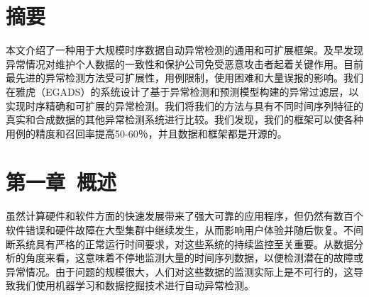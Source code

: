 \documentclass[a4paper,AutoFakeBold,oneside,12pt]{book}
\begin{document}
\thispagestyle{empty}

\begin{center}
\sihao{}

\xiaosihao{}

\xiaosihao{}
\end{center}

\songti{}
\let\clearpage\relax


\chapter*{摘要}
本文介绍了一种用于大规模时序数据自动异常检测的通用和可扩展框架。及早发现异常情况对维护个人数据的一致性和保护公司免受恶意攻击者起着关键作用。目前最先进的异常检测方法受可扩展性，用例限制，使用困难和大量误报的影响。我们在雅虎（EGADS）的系统设计了基于异常检测和预测模型构建的异常过滤层，以实现时序精确和可扩展的异常检测。我们将我们的方法与具有不同时间序列特征的真实和合成数据的其他异常检测系统进行比较。我们发现，我们的框架可以使各种用例的精度和召回率提高50-60％，并且数据和框架都是开源的。


\chapter*{第一章\ 概述}
虽然计算硬件和软件方面的快速发展带来了强大可靠的应用程序，但仍然有数百个软件错误和硬件故障在大型集群中继续发生，从而影响用户体验并随后恢复。不间断系统具有严格的正常运行时间要求，对这些系统的持续监控至关重要。从数据分析的角度来看，这意味着不停地监测大量的时间序列数据，以便检测潜在的故障或异常情况。由于问题的规模很大，人们对这些数据的监测实际上是不可行的，这导致我们使用机器学习和数据挖掘技术进行自动异常检测。
\end{document}

